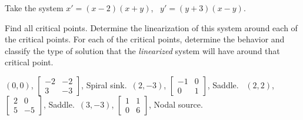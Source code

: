 \begin{exercise}
Take the system $x' = (x-2)(x+y)$, \ $y' = (y+3)(x-y)$.
\begin{tasks}
\task Find all critical points.
\task Determine the linearization of this system around each of the critical points.
\task For each of the critical points, determine the behavior and classify the type of solution that the \emph{linearized} system will have around that critical point. 
\end{tasks}
\end{exercise}
\comboSol{%
}
{%
$(0,0)$, $\left[\begin{smallmatrix} -2 & -2 \\ 3 & -3 \end{smallmatrix}\right]$, Spiral sink.\ $(2, -3)$, $\left[\begin{smallmatrix} -1 & 0 \\ 0 & 1 \end{smallmatrix}\right]$, Saddle. \ 
$(2, 2)$, $\left[\begin{smallmatrix} 2 & 0 \\ 5 & -5 \end{smallmatrix}\right]$, Saddle.\ 
$(3, -3)$, $\left[\begin{smallmatrix} 1 & 1 \\ 0 & 6 \end{smallmatrix}\right]$, Nodal source. 
}

